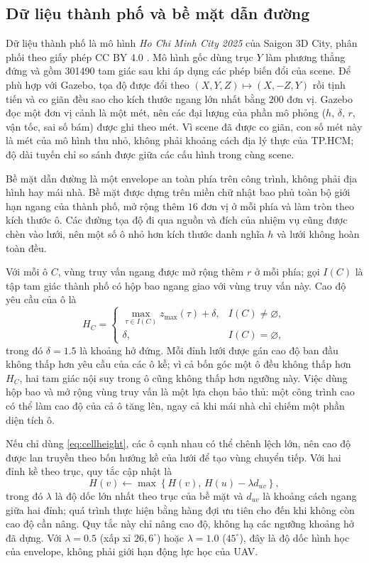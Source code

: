 \subsection{Dữ liệu thành phố và bề mặt dẫn đường}\label{sec:stage-data}

Dữ liệu thành phố là mô hình \textit{Ho Chi Minh City 2025} của Saigon 3D City,
phân phối theo giấy phép CC BY 4.0 \cite{cityasset}. Mô hình gốc dùng trục $Y$
làm phương thẳng đứng và gồm \num{301490} tam giác sau khi áp dụng các phép biến
đổi của scene. Để phù hợp với Gazebo, tọa độ được đổi theo
$(X,Y,Z)\mapsto(X,-Z,Y)$ rồi tịnh tiến và co giãn đều sao cho kích thước ngang
lớn nhất bằng $200$ đơn vị. Gazebo đọc một đơn vị cảnh là một mét, nên các đại
lượng của phần mô phỏng ($h$, $\delta$, $r$, vận tốc, sai số bám) được ghi theo
mét. Vì scene đã được co giãn, con số mét này là mét của mô hình thu nhỏ, không
phải khoảng cách địa lý thực của TP.HCM; độ dài tuyến chỉ so sánh được giữa các
cấu hình trong cùng scene.

Bề mặt dẫn đường là một envelope an toàn phía trên công trình, không phải địa
hình hay mái nhà. Bề mặt được dựng trên miền chữ nhật bao phủ toàn bộ giới hạn
ngang của thành phố, mở rộng thêm $16$ đơn vị ở mỗi phía và làm tròn theo kích
thước ô. Các đường tọa độ đi qua nguồn và đích của nhiệm vụ cũng được chèn vào
lưới, nên một số ô nhỏ hơn kích thước danh nghĩa $h$ và lưới không hoàn toàn đều.

Với mỗi ô $C$, vùng truy vấn ngang được mở rộng thêm $r$ ở mỗi phía; gọi $I(C)$
là tập tam giác thành phố có hộp bao ngang giao với vùng truy vấn này. Cao độ yêu
cầu của ô là
\begin{equation}
  H_C=
  \begin{cases}
    \displaystyle\max_{\tau\in I(C)}z_{\max}(\tau)+\delta, & I(C)\ne\varnothing,\\[0.4em]
    \delta, & I(C)=\varnothing,
  \end{cases}
  \label{eq:cellheight}
\end{equation}
trong đó $\delta=\num{1.5}$ là khoảng hở đứng. Mỗi đỉnh lưới được gán cao độ ban
đầu không thấp hơn yêu cầu của các ô kề; vì cả bốn góc một ô đều không thấp hơn
$H_C$, hai tam giác nội suy trong ô cũng không thấp hơn ngưỡng này. Việc dùng hộp
bao và mở rộng vùng truy vấn là một lựa chọn bảo thủ: một công trình cao có thể
làm cao độ của cả ô tăng lên, ngay cả khi mái nhà chỉ chiếm một phần diện tích ô.

Nếu chỉ dùng \eqref{eq:cellheight}, các ô cạnh nhau có thể chênh lệch lớn, nên cao
độ được lan truyền theo bốn hướng kề của lưới để tạo vùng chuyển tiếp. Với hai
đỉnh kề theo trục, quy tắc cập nhật là
\begin{equation}
  H(v)\leftarrow\max\left\{H(v),\,H(u)-\lambda d_{uv}\right\},
  \label{eq:ramp}
\end{equation}
trong đó $\lambda$ là độ dốc lớn nhất theo trục của bề mặt và $d_{uv}$ là khoảng
cách ngang giữa hai đỉnh; quá trình thực hiện bằng hàng đợi ưu tiên cho đến khi
không còn cao độ cần nâng. Quy tắc này chỉ nâng cao độ, không hạ các ngưỡng khoảng
hở đã dựng. Với $\lambda=\num{0.5}$ (xấp xỉ $26{,}6^\circ$) hoặc
$\lambda=\num{1.0}$ ($45^\circ$), đây là độ dốc hình học của envelope, không phải
giới hạn động lực học của UAV.

